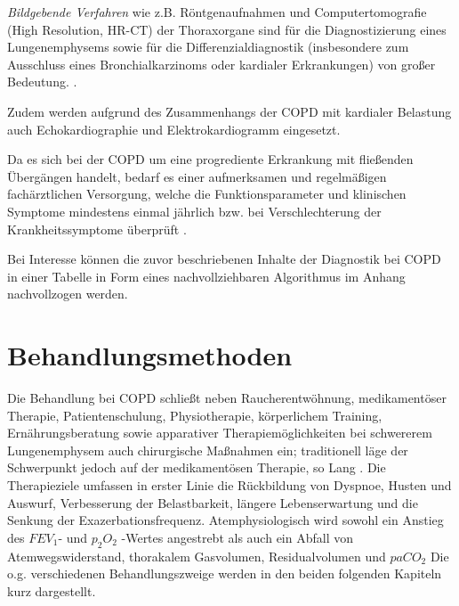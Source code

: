 \emph{Bildgebende Verfahren} wie z.B. Röntgenaufnahmen und Computertomografie (High Resolution, HR-CT) der Thoraxorgane sind für die Diagnostizierung eines Lungenemphysems sowie für die Differenzialdiagnostik (insbesondere zum Ausschluss eines Bronchialkarzinoms oder kardialer Erkrankungen) von großer Bedeutung. \autocite[191]{welte2007}.

Zudem werden aufgrund des Zusammenhangs der COPD mit kardialer Belastung auch Echokardiographie und Elektrokardiogramm eingesetzt.

Da es sich bei der COPD um eine progrediente Erkrankung mit fließenden Übergängen handelt, bedarf es einer aufmerksamen und regelmäßigen fachärztlichen Versorgung, welche die Funktionsparameter und klinischen Symptome mindestens einmal jährlich bzw. bei Verschlechterung der Krankheitssymptome überprüft \autocite[vgl.][e8ff.]{vogelmeier2007}.

Bei Interesse können die zuvor beschriebenen Inhalte der Diagnostik bei COPD in einer Tabelle in Form eines nachvollziehbaren Algorithmus im Anhang nachvollzogen werden.

\section{Behandlungsmethoden}
\label{behandlungsmethoden}
Die Behandlung bei COPD schließt neben Raucherentwöhnung, medikamentöser Therapie, Patientenschulung, Physiotherapie, körperlichem Training, Ernährungsberatung sowie apparativer Therapiemöglichkeiten bei schwererem Lungenemphysem auch chirurgische Maßnahmen ein; traditionell läge der Schwerpunkt jedoch auf der medikamentösen Therapie, so Lang \autocite[vgl.][287]{lang2007}. Die Therapieziele umfassen in erster Linie die Rückbildung von Dyspnoe, Husten und Auswurf, Verbesserung der Belastbarkeit, längere Lebenserwartung und die Senkung der Exazerbationsfrequenz. Atemphysiologisch wird sowohl ein Anstieg des $FEV_{1}$- und $p_{2}O_{2}$ -Wertes angestrebt als auch ein Abfall von Atemwegswiderstand, thorakalem Gasvolumen, Residualvolumen und $paCO_{2}$ \autocite[vgl.][158]{lorenz2009}
Die o.g. verschiedenen Behandlungszweige werden in den beiden folgenden Kapiteln kurz dargestellt.

